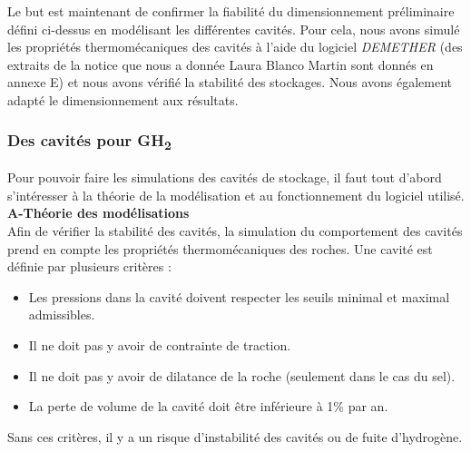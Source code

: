 \documentclass[11pt,french,a4paper]{article}
\begin{document}
Le but est maintenant de confirmer la fiabilité du dimensionnement préliminaire défini ci-dessus en modélisant les différentes cavités. Pour cela, nous avons simulé les propriétés thermomécaniques des cavités à l’aide du logiciel \emph{DEMETHER} (des extraits de la notice que nous a donnée Laura Blanco Martin sont donnés en annexe E) et nous avons vérifié la stabilité des stockages. Nous avons également adapté le dimensionnement aux résultats.

\subsubsection{Des cavités pour GH\textsubscript{2}}
Pour pouvoir faire les simulations des cavités de stockage, il faut tout d’abord s’intéresser à la théorie de la modélisation et au fonctionnement du logiciel utilisé. \\

\textbf{A-Théorie des modélisations}\\

Afin de vérifier la stabilité des cavités, la simulation du comportement des cavités prend en compte les propriétés thermomécaniques des roches. Une cavité est définie par plusieurs critères :
\begin{itemize}
\item Les pressions dans la cavité doivent respecter les seuils minimal et maximal admissibles.
\item Il ne doit pas y avoir de contrainte de traction.
\item Il ne doit pas y avoir de dilatance de la roche (seulement dans le cas du sel).
\item La perte de volume de la cavité doit être inférieure à 1\% par an.
\end{itemize}
Sans ces critères, il y a un risque d’instabilité des cavités ou de fuite d’hydrogène.
\end{document}
